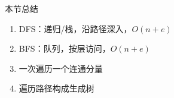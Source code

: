 \documentclass[10pt, aspectratio=169]{beamer}
\begin{document}
\begin{frame}{本节总结}
\begin{enumerate}
\item DFS：递归/栈，沿路径深入，$O(n+e)$
\item BFS：队列，按层访问，$O(n+e)$
\item 一次遍历一个连通分量
\item 遍历路径构成生成树
\end{enumerate}
\end{frame}
\end{document}
